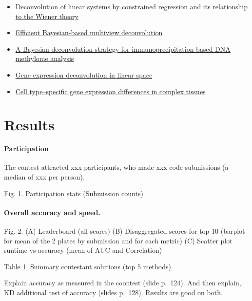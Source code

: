 \documentclass[]{article}
\let\oldparagraph\paragraph
\renewcommand{\paragraph}[1]{\oldparagraph{#1}\mbox{}}
\begin{document}
\begin{itemize}
\item
  \href{https://ieeexplore.ieee.org/abstract/document/4044778}{Deconvolution
  of linear systems by constrained regression and its relationship to
  the Wiener theory}
\item
  \href{https://www.nature.com/articles/nmeth.2929}{Efficient
  Bayesian-based multiview deconvolution}
\item
  \href{https://www.nature.com/articles/nbt1414}{A Bayesian
  deconvolution strategy for immunoprecipitation-based DNA methylome
  analysis}
\item
  \href{https://www.nature.com/articles/nmeth.1830}{Gene expression
  deconvolution in linear space}
\item
  \href{https://www.nature.com/articles/nmeth.1439}{Cell type--specific
  gene expression differences in complex tissues}
\end{itemize}

\hypertarget{results}{%
\section{Results}\label{results}}

\hypertarget{participation}{%
\paragraph{Participation}\label{participation}}

The contest attracted xxx participants, who made xxx code submissions (a
median of xxx per person).

Fig. 1. Participation stats (Submission counts)

\hypertarget{overall-accuracy-and-speed.}{%
\paragraph{Overall accuracy and
speed.}\label{overall-accuracy-and-speed.}}

Fig. 2. (A) Leaderboard (all scores) (B) Disaggregated scores for top 10
(barplot for mean of the 2 plates by submission and for each metric) (C)
Scatter plot runtime vs accuracy (mean of AUC and Correlation)

Table 1. Summary contestant solutions (top 5 methods)

Explain accuracy as measured in the coontest (slide p.~124). And then
explain, KD additional test of accuracy (slides p.~128). Results are
good on both.
\end{document}
